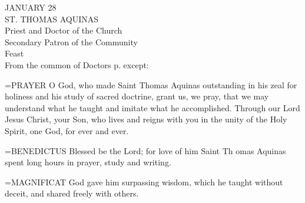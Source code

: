 \begin{center}\normalsize JANUARY 28\\
\footnotesize ST. THOMAS AQUINAS\\
\footnotesize Priest and Doctor of the Church\\
\footnotesize Secondary Patron of the Community\\
\footnotesize Feast\\
\footnotesize From the common of Doctors p.    except:\\
\end{center}

\hangindent=\parindent \small{PRAYER 
O God, who made Saint Thomas Aquinas
outstanding in his zeal for holiness
and his study of sacred doctrine,
grant us, we pray,
that we may understand what he taught
and imitate what he accomplished.
Through our Lord Jesus Christ, your Son,
who lives and reigns with you in the unity of the Holy Spirit,
one God, for ever and ever.\\}
 
\hangindent=\parindent \small{BENEDICTUS  Blessed be the Lord; for love of him Saint Th omas Aquinas
spent long hours in prayer, study and writing.\\}
 
\hangindent=\parindent \small{MAGNIFICAT  God gave him surpassing wisdom, which he taught
without deceit, and shared freely with others.\\}
 
 

